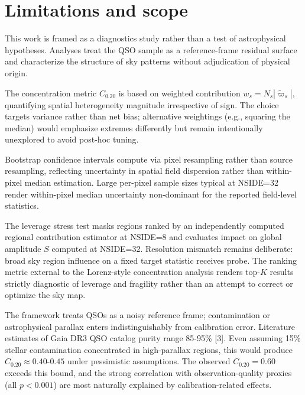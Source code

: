 \section{Limitations and scope}

This work is framed as a diagnostics study rather than a test of astrophysical hypotheses. Analyses treat the QSO sample as a reference-frame residual surface and characterize the structure of sky patterns without adjudication of physical origin.

The concentration metric $C_{0.20}$ is based on weighted contribution $w_s = N_s |\tilde{\varpi}_s|$, quantifying spatial heterogeneity magnitude irrespective of sign. The choice targets variance rather than net bias; alternative weightings (e.g., squaring the median) would emphasize extremes differently but remain intentionally unexplored to avoid post-hoc tuning.

Bootstrap confidence intervals compute via pixel resampling rather than source resampling, reflecting uncertainty in spatial field dispersion rather than within-pixel median estimation. Large per-pixel sample sizes typical at NSIDE=32 render within-pixel median uncertainty non-dominant for the reported field-level statistics.

The leverage stress test masks regions ranked by an independently computed regional contribution estimator at NSIDE=8 and evaluates impact on global amplitude $S$ computed at NSIDE=32. Resolution mismatch remains deliberate: broad sky region influence on a fixed target statistic receives probe. The ranking metric external to the Lorenz-style concentration analysis renders top-$K$ results strictly diagnostic of leverage and fragility rather than an attempt to correct or optimize the sky map.

The framework treats QSOs as a noisy reference frame; contamination or astrophysical parallax enters indistinguishably from calibration error. Literature estimates of Gaia DR3 QSO catalog purity range 85-95\% [3]. Even assuming 15\% stellar contamination concentrated in high-parallax regions, this would produce $C_{0.20} \approx 0.40$-$0.45$ under pessimistic assumptions. The observed $C_{0.20} = 0.60$ exceeds this 
bound, and the strong correlation with observation-quality proxies (all $p < 0.001$) are most naturally explained by calibration-related effects.

